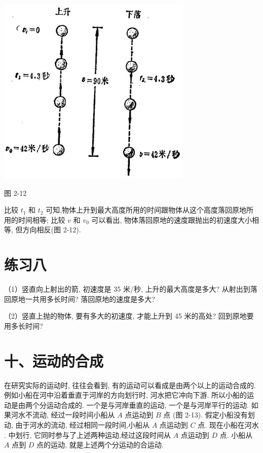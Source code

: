 \documentclass[10pt]{article}
\begin{document}
\begin{center}
\includegraphics[max width=0.7\textwidth]{images/01912d55-147c-70aa-b0e0-1782a122f948_83_871635.jpg}
\end{center}

图 2-12

比较 \({t}_{1}\) 和 \({t}_{2}\) 可知,物体上升到最大高度所用的时间跟物体从这个高度落回原地所用的时间相等; 比较 \(v\) 和 \({v}_{0}\) 可以看出, 物体落回原地的速度跟抛出的初速度大小相等, 但方向相反(图 2-12).

\section*{练习八}

（1）竖直向上射出的箭, 初速度是 35 米/秒, 上升的最大高度是多大? 从射出到落回原地一共用多长时间? 落回原地的速度是多大?

（2）竖直上抛的物体, 要有多大的初速度, 才能上升到 45 米的高处? 回到原地要用多长时间?

\section*{十、运动的合成}

在研究实际的运动时, 往往会看到, 有的运动可以看成是由两个以上的运动合成的. 例如小船在河中沿着垂直于河岸的方向划行时, 河水把它冲向下游. 所以小船的运动是由两个分运动合成的. 一个是与河岸垂直的运动, 一个是与河岸平行的运动. 如果河水不流动, 经过一段时间小船从 \(A\) 点运动到 \(B\) 点 (图 2-13). 假定小船没有划动, 由于河水的流动, 经过相同一段时间,小船从 \(A\) 点运动到 \(C\) 点. 现在小船在河水 . 中划行, 它同时参与了上述两种运动,经过这段时间从 \(A\) 点运动到 \(D\) 点. 小船从 \(A\) 点到 \(D\) 点的运动, 就是上述两个分运动的合运动.
\end{document}
